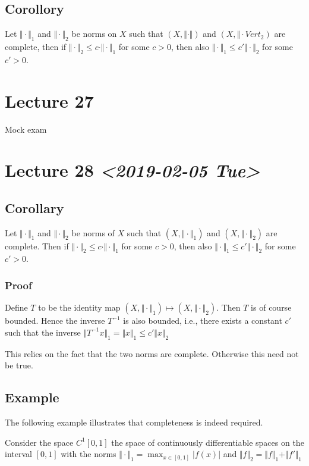\documentclass[11pt]{article}
\begin{document}
\subsection{Corollory}
\label{sec:orga267f51}
Let \(\Vert \cdot \Vert_1\) and \(\Vert \cdot \Vert_2\) be norms on \(X\) such that
\((X, \Vert \cdot \Vert)\) and \((X, \Vert \cdot Vert_2)\) are complete, then if
\(\Vert \cdot \Vert_2 \le c \cdot \Vert \cdot \Vert_1\) for some \(c > 0\), then
also \(\Vert \cdot \Vert_1 \le c' \Vert \cdot \Vert_2\) for some \(c' > 0\).
\section{Lecture 27}
\label{sec:org652a66b}
Mock exam
\section{Lecture 28 \textit{<2019-02-05 Tue>}}
\label{sec:org92afa79}
\subsection{Corollary}
\label{sec:orgbd22e8c}
Let \(\Vert \cdot \Vert_1\) and \(\Vert \cdot \Vert_2\) be norms of \(X\) such that
\((X, \Vert \cdot \Vert_1)\) and \((X, \Vert \cdot \Vert_2)\) are complete. Then
if \(\Vert \cdot \Vert_2 \le c \cdot \Vert \cdot \Vert_1\) for some \(c > 0\),
then also \(\Vert \cdot \Vert_1 \le c' \Vert \cdot \Vert_2\) for some \(c' > 0\).
\subsubsection{Proof}
\label{sec:orgead5b05}
Define \(T\) to be the identity map \((X, \Vert \cdot \Vert_1) \mapsto (X,
    \Vert \cdot \Vert_2)\). Then \(T\) is of course bounded. Hence the inverse
\(T^{-1}\) is also bounded, i.e., there exists a constant \(c'\) such that the
inverse \(\Vert T^{-1} x\Vert_1 = \Vert x \Vert_1 \le c' \Vert x \Vert_2\)

This relies on the fact that the two norms are complete. Otherwise this need
not be true.
\subsection{Example}
\label{sec:org2f30e8f}
The following example illustrates that completeness is indeed required.

Consider the space \(C^{1}[0, 1]\) the space of continuously differentiable
spaces on the interval \([0, 1]\) with the norms \(\Vert \cdot \Vert_1 = \max_{x
   \in [0, 1]} \vert f(x) \vert\) and \(\Vert f\Vert_2 = \Vert f \Vert_1+ \Vert
   f'\Vert_1\)
\end{document}
